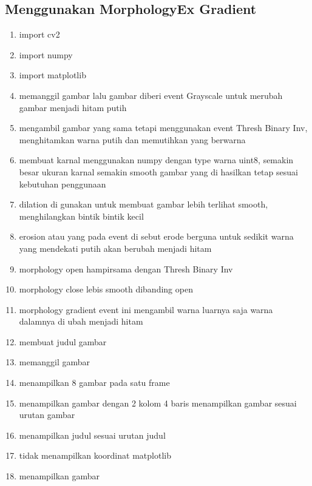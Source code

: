\subsection{Menggunakan MorphologyEx Gradient}

\begin{enumerate}
	\item import cv2
	\item import numpy
	\item import matplotlib
	\item memanggil gambar lalu gambar diberi event Grayscale untuk merubah gambar menjadi hitam putih
	\item mengambil gambar yang sama tetapi menggunakan event Thresh Binary Inv, menghitamkan warna putih dan memutihkan yang berwarna
	\item membuat karnal menggunakan numpy dengan type warna uint8, semakin besar ukuran karnal semakin smooth gambar yang di hasilkan tetap sesuai kebutuhan penggunaan
	\item dilation di gunakan untuk membuat gambar lebih terlihat smooth, menghilangkan bintik bintik kecil
	\item erosion atau yang pada event di sebut erode berguna untuk sedikit warna yang mendekati putih akan berubah menjadi hitam
	\item morphology open hampirsama dengan Thresh Binary Inv
	\item morphology close lebis smooth dibanding open
	\item morphology gradient event ini mengambil warna luarnya saja warna dalamnya di ubah menjadi hitam
	\item membuat judul gambar
	\item memanggil gambar
	\item menampilkan 8 gambar pada satu frame
	\item menampilkan gambar dengan 2 kolom 4 baris menampilkan gambar sesuai urutan gambar
	\item menampilkan judul sesuai urutan judul
	\item tidak menampilkan koordinat matplotlib
	\item menampilkan gambar
\end{enumerate}

